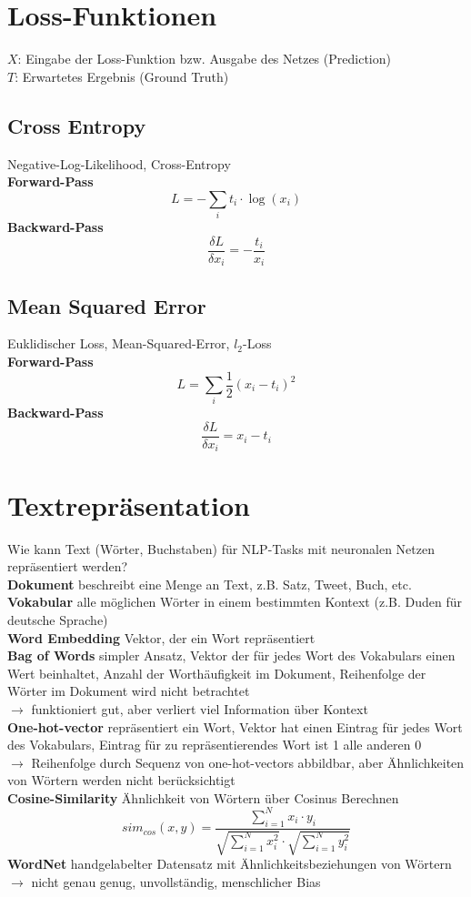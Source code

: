 \documentclass[12pt]{article}
\begin{document}
	\section{Loss-Funktionen}
	$X$: Eingabe der Loss-Funktion bzw. Ausgabe des Netzes (Prediction)\\
	$T$: Erwartetes Ergebnis (Ground Truth)
	\subsection{Cross Entropy}
	Negative-Log-Likelihood, Cross-Entropy\\
	\textbf{Forward-Pass} $$L = -\sum_i t_i \cdot \log(x_i)$$
	\textbf{Backward-Pass} $$\frac{\delta L}{\delta x_i} = -\frac{t_i}{x_i}$$
	\subsection{Mean Squared Error}
	Euklidischer Loss, Mean-Squared-Error, $l_2$-Loss\\
	\textbf{Forward-Pass} $$L = \sum_i \frac{1}{2} (x_i - t_i)^2$$
	\textbf{Backward-Pass} $$\frac{\delta L}{\delta x_i} = x_i - t_i$$

	\section{Textrepräsentation}
	Wie kann Text (Wörter, Buchstaben) für NLP-Tasks mit neuronalen Netzen repräsentiert werden?\\
	\textbf{Dokument} beschreibt eine Menge an Text, z.B. Satz, Tweet, Buch, etc.\\
	\textbf{Vokabular} alle möglichen Wörter in einem bestimmten Kontext (z.B. Duden für deutsche Sprache)\\
	\textbf{Word Embedding} Vektor, der ein Wort repräsentiert\\
	\textbf{Bag of Words} simpler Ansatz, Vektor der für jedes Wort des Vokabulars einen Wert beinhaltet, Anzahl der Worthäufigkeit im Dokument, Reihenfolge der Wörter im Dokument wird nicht betrachtet\\
	$\rightarrow$ funktioniert gut, aber verliert viel Information über Kontext\\
	\textbf{One-hot-vector} repräsentiert ein Wort, Vektor hat einen Eintrag für jedes Wort des Vokabulars, Eintrag für zu repräsentierendes Wort ist 1 alle anderen 0\\
	$\rightarrow$ Reihenfolge durch Sequenz von one-hot-vectors abbildbar, aber Ähnlichkeiten von Wörtern werden nicht berücksichtigt\\
	\textbf{Cosine-Similarity} Ähnlichkeit von Wörtern über Cosinus Berechnen
	$$sim_{cos}(x,y) = \frac{\sum_{i=1}^N x_i \cdot y_i}{\sqrt{\sum_{i=1}^N x_i^2} \cdot \sqrt{\sum_{i=1}^N y_i^2}}$$
	\textbf{WordNet} handgelabelter Datensatz mit Ähnlichkeitsbeziehungen von Wörtern $\rightarrow$ nicht genau genug, unvollständig, menschlicher Bias\\
\end{document}
